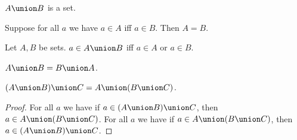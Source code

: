 \begin{signature}\label{example_union}
    $A\union B$ is a set.
\end{signature}

\begin{axiom}[Extensionality]\label{ext}
    Suppose for all $a$ we have $a\in A$ iff $a\in B$.
    Then $A = B$.
\end{axiom}

\begin{axiom}\label{union_defn}
    Let $A, B$ be sets.
    $a\in A\union B$ iff $a\in A$ or $a\in B$.
\end{axiom}

\begin{proposition}\label{union_comm}
    $A\union B = B\union A$.
\end{proposition}

\begin{proposition}\label{union_assoc}
    $(A\union B)\union C = A\union (B\union C)$.
\end{proposition}
\begin{proof}
    For all $a$ we have if $a\in (A\union B)\union C$, then $a\in A\union (B\union C)$.
    For all $a$ we have if $a\in A\union (B\union C)$, then $a\in (A\union B)\union C$.
\end{proof}
